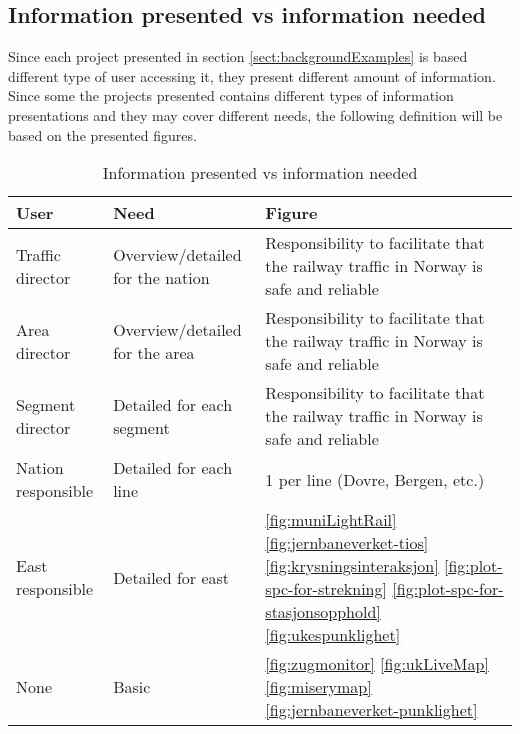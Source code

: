 
\clearpage
\subsection{Information presented vs information needed} %
\label{sub:information_presented_vs_information_needed}

Since each project presented in section \vref{sect:backgroundExamples} is
based different type of user accessing it, they present different amount of
information. Since some the projects presented contains different types of
information presentations and they may cover different needs, the following 
definition will be based on the presented figures. 

\begin{table}[!h]\small
	\begin{tabularx}{\textwidth}{|l|l|X|}
		\hline
		User & Need & Figure \\
		\hline
		Traffic director & Overview/detailed for the nation & Responsibility to facilitate that the railway traffic in Norway is safe and reliable\\
		\hline
		Area director & Overview/detailed for the area & Responsibility to facilitate that the railway traffic in Norway is safe and reliable\\
		\hline
		Segment director & Detailed for each segment & Responsibility to facilitate that the railway traffic in Norway is safe and reliable\\
		\hline
		Nation responsible & Detailed for each line & 1 per line (Dovre, Bergen, etc.)\\
		\hline
		East responsible & Detailed for east & 
						\vref{fig:muniLightRail} \newline
						\vref{fig:jernbaneverket-tios} \newline
						\vref{fig:krysningsinteraksjon} \newline
						\vref{fig:plot-spc-for-strekning} \newline
						\vref{fig:plot-spc-for-stasjonsopphold} \newline
						\vref{fig:ukespunklighet}\\
		\hline
		None & Basic & 	\vref{fig:zugmonitor}\newline
						\vref{fig:ukLiveMap} \newline
						\vref{fig:miserymap} \newline
						\vref{fig:jernbaneverket-punklighet}\\
		\hline
	\end{tabularx}
\caption{Information presented vs information needed}
\label{table:information_presented_vs_information_needed}
\end{table}



